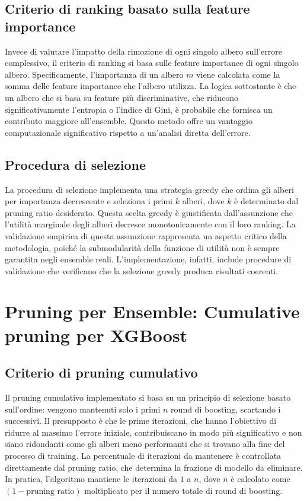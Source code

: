 \documentclass[a4paper,12pt]{report}
\begin{document}
	\subsection{Criterio di ranking basato sulla feature importance}
	Invece di valutare l'impatto della rimozione di ogni singolo albero sull'errore complessivo, il criterio di ranking si basa sulle feature importance di ogni singolo albero. Specificamente, l'importanza di un albero $m$ viene calcolata come la somma delle feature importance che l'albero utilizza. La logica sottostante è che un albero che si basa su feature più discriminative, che riducono significativamente l'entropia o l'indice di Gini, è probabile che fornisca un contributo maggiore all'ensemble. Questo metodo offre un vantaggio computazionale significativo rispetto a un'analisi diretta dell'errore.
	
	\subsection{Procedura di selezione}
	La procedura di selezione implementa una strategia greedy che ordina gli alberi per importanza decrescente e seleziona i primi $k$ alberi, dove $k$ è determinato dal pruning ratio desiderato. Questa scelta greedy è giustificata dall'assunzione che l'utilità marginale degli alberi decresce monotonicamente con il loro ranking. La validazione empirica di questa assunzione rappresenta un aspetto critico della metodologia, poiché la submodularità della funzione di utilità non è sempre garantita negli ensemble reali. L'implementazione, infatti, include procedure di validazione che verificano che la selezione greedy produca risultati coerenti.
	
	\section{Pruning per Ensemble: Cumulative pruning per XGBoost}
	
	\subsection{Criterio di pruning cumulativo}
	Il pruning cumulativo implementato si basa su un principio di selezione basato sull'ordine: vengono mantenuti solo i primi $n$ round di boosting, scartando i successivi. Il presupposto è che le prime iterazioni, che hanno l'obiettivo di ridurre al massimo l'errore iniziale, contribuiscano in modo più significativo e non siano ridondanti come gli alberi meno performanti che si trovano alla fine del processo di training. La percentuale di iterazioni da mantenere è controllata direttamente dal pruning ratio, che determina la frazione di modello da eliminare. In pratica, l'algoritmo mantiene le iterazioni da $1$ a $n$, dove $n$ è calcolato come $(1 - \text{pruning ratio})$ moltiplicato per il numero totale di round di boosting.
	
\end{document}
